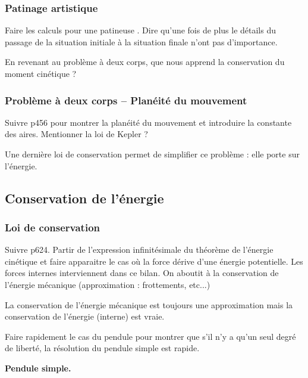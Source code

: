 \subsubsection{Patinage artistique}

Faire les calculs pour une patineuse \cite{Perez2014}.
Dire qu'une fois de plus le détails du passage de la situation initiale à la situation finale n'ont pas d'importance.

\begin{transition}
En revenant au problème à deux corps, que nous apprend la conservation du moment cinétique ?
\end{transition}

\subsubsection{Problème à deux corps -- Planéité du mouvement}

Suivre \cite{Michel2017} p456 pour montrer la planéité du mouvement et introduire la constante des aires.
Mentionner la loi de Kepler ?

\begin{transition}
Une dernière loi de conservation permet de simplifier ce problème : elle porte sur l'énergie.
\end{transition}

\subsection{Conservation de l'énergie}

\subsubsection{Loi de conservation}

Suivre \cite{Salamito2016} p624.
Partir de l'expression infinitésimale du théorème de l'énergie cinétique et faire apparaitre le cas où la force dérive d'une énergie potentielle.
Les forces internes interviennent dans ce bilan.
On aboutit à la conservation de l'énergie mécanique (approximation : frottements, etc...)

\begin{remarque}
La conservation de l'énergie mécanique est toujours une approximation mais la conservation de l'énergie (interne) est vraie.
\end{remarque}

Faire rapidement le cas du pendule pour montrer que s'il n'y a qu'un seul degré de liberté, la résolution du pendule simple est rapide.
\begin{experience}
\textbf{Pendule simple.}
\end{experience}


